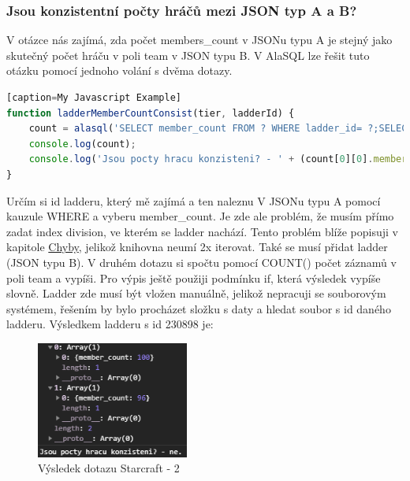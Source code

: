 \documentclass[a4, titlepage]{article}
\begin{document}
\subsubsection{Jsou konzistentní počty hráčů mezi JSON typ A a B?}
V otázce nás zajímá, zda počet members\_count v JSONu typu A je stejný jako skutečný počet hráču v poli team v JSON typu B. V AlaSQL lze řešit tuto otázku pomocí jednoho volání s dvěma dotazy. 
\begin{lstlisting}[language=JavaScript][caption=My Javascript Example]
function ladderMemberCountConsist(tier, ladderId) {
    count = alasql('SELECT member_count FROM ? WHERE ladder_id= ?;SELECT COUNT(*) AS member_count FROM ?', [tier.tier[0].division, ladderId, ladder230898_1031.team])
    console.log(count);
    console.log('Jsou pocty hracu konzisteni? - ' + (count[0][0].member_count === count[1][0].member_count ? 'ano.' : 'ne.'));
}
\end{lstlisting}
Určím si id ladderu, který mě zajímá a ten naleznu V JSONu typu A pomocí kauzule WHERE a vyberu member\_count. Je zde ale problém, že musím přímo zadat index division, ve kterém se ladder nachází. Tento problém blíže popisuji v kapitole \hyperlink{Error}{Chyby}, jelikož knihovna neumí 2x iterovat. Také se musí přidat ladder (JSON typu B).
V druhém dotazu si spočtu pomocí COUNT() počet záznamů v poli team a vypíši. Pro výpis ještě použiji podmínku if, která výsledek vypíše slovně.
Ladder zde musí být vložen manuálně, jelikož nepracuji se souborovým systémem, řešením by bylo procházet složku s daty a hledat soubor s id daného ladderu. Výsledkem ladderu s id 230898 je:
\begin{figure}[h]
    \centering
    \includegraphics[width=5cm]{S2}
    \caption{Výsledek dotazu Starcraft - 2}
\end{figure}
\newpage
\end{document}
